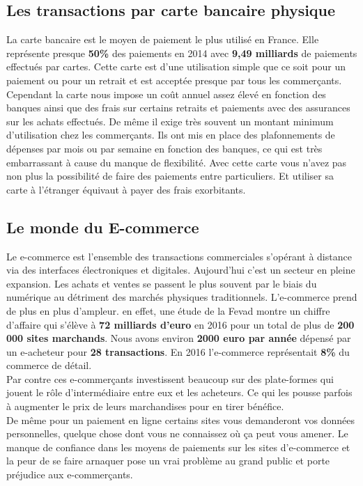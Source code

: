\documentclass[12pt]{report}
\begin{document}
    \subsection{Les transactions par carte bancaire physique}
\hspace{1cm} La carte bancaire est le moyen de paiement le plus utilisé en France. Elle représente presque \textbf{50\%} des paiements en 2014 avec \textbf{9,49 milliards} de paiements effectués par cartes. Cette carte est d'une utilisation simple que ce soit pour un paiement ou pour un retrait et est acceptée presque par tous les commerçants.\\

\hspace{1cm} Cependant la carte nous impose un coût annuel assez élevé en fonction des banques ainsi que des frais sur certains retraits et paiements avec des assurances sur les achats effectués. De même il exige très souvent un montant minimum d'utilisation chez les commerçants. Ils ont mis en place des plafonnements de dépenses par mois ou par semaine en fonction des banques, ce qui est très embarrassant à cause du manque de flexibilité. Avec cette carte vous n'avez pas non plus la possibilité de faire des paiements entre particuliers. Et utiliser sa carte à l'étranger équivaut à payer des frais exorbitants.

    \subsection{Le monde du E-commerce}
\hspace{1cm} Le e-commerce est l'ensemble des transactions commerciales s'opérant à distance via des interfaces électroniques et digitales. Aujourd'hui c'est un secteur en pleine expansion. Les achats et ventes se passent le plus souvent par le biais du numérique au détriment des marchés physiques traditionnels. L'e-commerce prend de plus en plus d'ampleur. en effet, une étude de la Fevad montre un chiffre d'affaire qui s'élève à \textbf{72 milliards d'euro} en 2016 pour un total de plus de \textbf{200 000 sites marchands}. Nous avons environ \textbf{2000 euro par année} dépensé par un e-acheteur pour \textbf{28 transactions}. En 2016 l'e-commerce représentait \textbf{8\%} du commerce de détail.\\

\hspace{1cm} Par contre ces e-commerçants investissent beaucoup sur des plate-formes qui jouent le rôle d'intermédiaire entre eux et les acheteurs. Ce qui les pousse parfois à augmenter le prix de leurs marchandises pour en tirer bénéfice.\\ De même pour un paiement en ligne certains sites vous demanderont vos données personnelles, quelque chose dont vous ne connaissez où ça peut vous amener. Le manque de confiance dans les moyens de paiements sur les sites d'e-commerce et la peur de se faire arnaquer pose un vrai problème au grand public et porte préjudice aux e-commerçants. 
\end{document}
